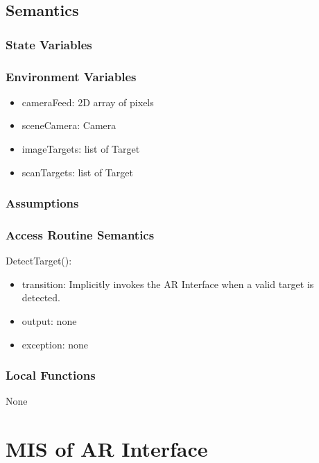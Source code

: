 \documentclass[12pt, titlepage]{article}
\begin{document}
\begin{itemize}
\begin{center}
\begin{tabular}{p{2cm} p{4cm} p{4cm} p{2cm}}
\hline
\end{tabular}
\end{center}

\subsection{Semantics}

\subsubsection{State Variables}

\subsubsection{Environment Variables}

\begin{itemize}
\item cameraFeed: 2D array of pixels
\item sceneCamera: Camera
\item imageTargets: list of Target
\item scanTargets: list of Target
\end{itemize}


\subsubsection{Assumptions}

\subsubsection{Access Routine Semantics}

\noindent DetectTarget():
\begin{itemize}
\item transition: Implicitly invokes the AR Interface when a valid target is detected.
\item output: none
\item exception: none
\end{itemize}

\subsubsection{Local Functions}

None

\newpage

\section{MIS of AR Interface} \label{mARInterface}


\end{itemize}
\end{document}
